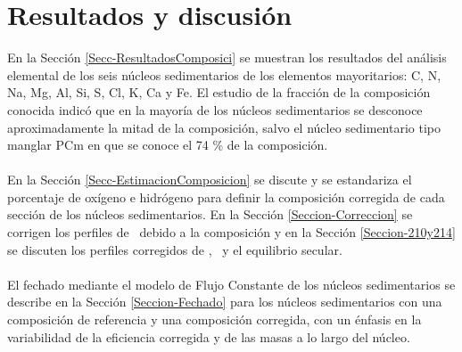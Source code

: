 \chapter{Resultados y discusión}
\lettrine{E}{}n la Sección \ref{Secc-ResultadosComposici} se muestran los resultados del análisis elemental de los seis núcleos sedimentarios de los  elementos mayoritarios: C, N, Na, Mg, Al, Si, S, Cl, K, Ca y Fe. El estudio de la fracción de la composición conocida indicó que en la mayoría de los núcleos sedimentarios se desconoce aproximadamente la mitad de la composición, salvo el núcleo sedimentario tipo manglar PCm en que se conoce el 74 \% de la composición. 
\\
\\
En la Sección \ref{Secc-EstimacionComposicion} se discute y se estandariza el porcentaje de oxígeno e hidrógeno para definir la composición corregida de cada sección de los núcleos sedimentarios. En la Sección \ref{Seccion-Correccion} se corrigen los perfiles de \PbCero\, debido a la composición y en la Sección \ref{Seccion-210y214} se discuten los perfiles corregidos de \PbCero, \PbCuatro\, y el equilibrio secular. 
\\
\\
El fechado mediante el modelo de Flujo Constante de los núcleos sedimentarios se describe en la Sección \ref{Seccion-Fechado} para los núcleos sedimentarios con una composición de referencia y una composición corregida, con un énfasis en la variabilidad de la eficiencia corregida y de las masas a lo largo del núcleo. 
